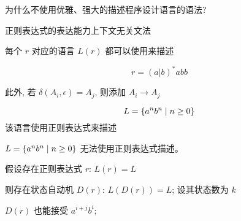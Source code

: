 
\begin{frame}{}
  \begin{center}
    为什么不使用优雅、强大的描述程序设计语言的语法?

    \vspace{0.50cm}
    正则表达式的表达能力上下文无关文法
  \end{center}
\end{frame}

\begin{frame}{}
  \begin{center}
    每个 $r$ 对应的语言 $L(r)$ 都可以使用来描述

    \[
      r = (a | b)^{\ast} abb
    \]

    \pause

    \pause
    此外, 若 $\delta(A_i, \epsilon) = A_{j}$, 则添加 $A_{i} \to A_{j}$
  \end{center}
\end{frame}

\begin{frame}{}
  \begin{center}
    

    \[
      L = \{a^{n} b^{n} \mid n \ge 0\}
    \]
    该语言使用正则表达式来描述
  \end{center}
\end{frame}

\begin{frame}{}
  \begin{theorem}
    $L = \{a^{n} b^{n} \mid n \ge 0\}$ 无法使用正则表达式描述。
  \end{theorem}

  \pause
  \begin{center}

    \pause
    \vspace{0.30cm}
    假设存在正则表达式 $r$: $L(r) = L$

    \pause
    \vspace{0.30cm}
    则存在状态自动机 $D(r)$: $L(D(r)) = L$; 设其状态数为 $k$

    \pause
    \vspace{0.30cm}

    \pause
    \vspace{0.30cm}
    $D(r)$ 也能接受 $a^{i+j} b^{i}$; 
  \end{center}
\end{frame}

